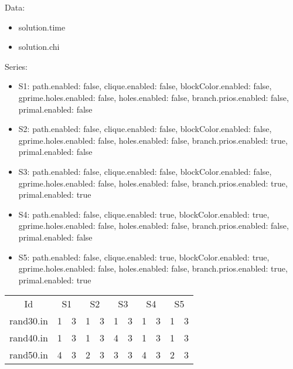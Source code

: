 \documentclass[a4paper]{article}
\begin{document}
Data:
\begin{itemize}
\item solution.time
\item solution.chi
\end{itemize}
Series:
\begin{itemize}
\item S1: path.enabled: false, clique.enabled: false, blockColor.enabled: false, gprime.holes.enabled: false, holes.enabled: false, branch.prios.enabled: false, primal.enabled: false
\item S2: path.enabled: false, clique.enabled: false, blockColor.enabled: false, gprime.holes.enabled: false, holes.enabled: false, branch.prios.enabled: true, primal.enabled: false
\item S3: path.enabled: false, clique.enabled: false, blockColor.enabled: false, gprime.holes.enabled: false, holes.enabled: false, branch.prios.enabled: true, primal.enabled: true
\item S4: path.enabled: false, clique.enabled: true, blockColor.enabled: true, gprime.holes.enabled: false, holes.enabled: false, branch.prios.enabled: false, primal.enabled: false
\item S5: path.enabled: false, clique.enabled: true, blockColor.enabled: true, gprime.holes.enabled: false, holes.enabled: false, branch.prios.enabled: true, primal.enabled: true
\end{itemize}
\begin{tabular}{|c|cc|cc|cc|cc|cc|}
\multicolumn{1}{|c|}{Id} & \multicolumn{2}{|c|}{S1} & \multicolumn{2}{|c|}{S2} & \multicolumn{2}{|c|}{S3} & \multicolumn{2}{|c|}{S4} & \multicolumn{2}{|c|}{S5}
\\
rand30.in &    1 &    3 &    1 &    3 &    1 &    3 &    1 &    3 &    1 &    3
\\
rand40.in &    1 &    3 &    1 &    3 &    4 &    3 &    1 &    3 &    1 &    3
\\
rand50.in &    4 &    3 &    2 &    3 &    3 &    3 &    4 &    3 &    2 &    3
\\
\end{tabular}
\end{document}
